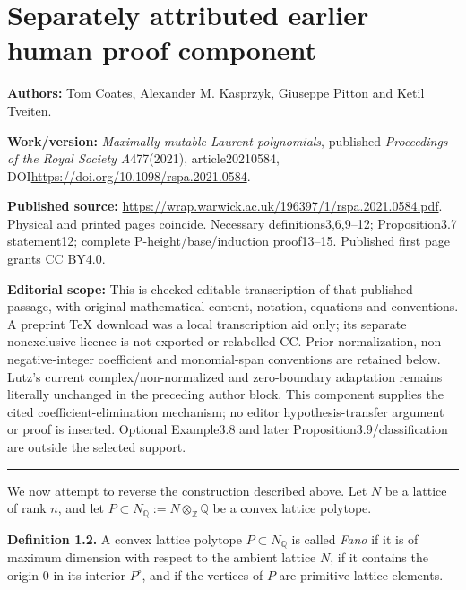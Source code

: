 \begingroup
\section*{Separately attributed earlier human proof component}
\noindent\textbf{Authors:} Tom Coates, Alexander M. Kasprzyk, Giuseppe Pitton and Ketil Tveiten.\par
\noindent\textbf{Work/version:} \emph{Maximally mutable Laurent polynomials}, published \emph{Proceedings of the Royal Society A}477(2021), article20210584, DOI\url{https://doi.org/10.1098/rspa.2021.0584}.\par
\noindent\textbf{Published source:} \url{https://wrap.warwick.ac.uk/196397/1/rspa.2021.0584.pdf}. Physical and printed pages coincide. Necessary definitions3,6,9--12; Proposition3.7 statement12; complete P-height/base/induction proof13--15. Published first page grants CC BY4.0.\par
\noindent\textbf{Editorial scope:} This is checked editable transcription of that published passage, with original mathematical content, notation, equations and conventions. A preprint TeX download was a local transcription aid only; its separate nonexclusive licence is not exported or relabelled CC. Prior normalization, non-negative-integer coefficient and monomial-span conventions are retained below. Lutz's current complex/non-normalized and zero-boundary adaptation remains literally unchanged in the preceding author block. This component supplies the cited coefficient-elimination mechanism; no editor hypothesis-transfer argument or proof is inserted. Optional Example3.8 and later Proposition3.9/classification are outside the selected support.\par
\medskip\hrule\medskip
\setcounter{equation}{0}
\renewcommand{\theequation}{3.\arabic{equation}}

We now attempt to reverse the construction described above. Let $N$ be a lattice of rank $n$, and let $P\subset{N_{\mathbb{Q}}}:=N\otimes_\mathbb{Z}\mathbb{Q}$ be a convex lattice polytope.
\par\noindent\textbf{Definition 1.2.} 
A convex lattice polytope $P\subset{N_{\mathbb{Q}}}$ is called \emph{Fano} if it is of maximum dimension with respect to the ambient lattice $N$, if it contains the origin $0$ in its interior ${P}^{\circ}$, and if the vertices of $P$ are primitive lattice elements. 

